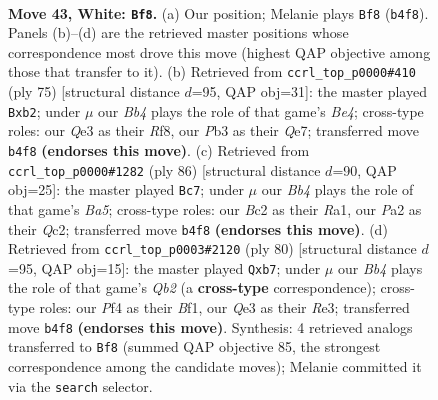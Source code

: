 \documentclass[11pt]{article}
\begin{document}
\clearpage

\begin{figure}[p]\centering
\begin{subfigure}{0.46\textwidth}\centering
\resizebox{\linewidth}{!}{%
\newchessgame
\chessboard[
  setfen={r1b4k/ppp2pp1/5n2/1q5p/1B3P1b/1P2Q2P/P1B3P1/R5K1 w - - 1 43},
  showmover=false,
  pgfstyle=straightmove, color=movearrow, markmove={b4-f8}
]}
\caption{}
\end{subfigure}\hfill
\begin{subfigure}{0.46\textwidth}\centering
\resizebox{\linewidth}{!}{%
\newchessgame
\chessboard[
  setfen={5r1k/4q1p1/6Bp/pb1QbP2/1p6/4B2P/PP4P1/2R3K1 b - - 0 38},
  showmover=false,
  pgfstyle=straightmove, color=movearrow, markmove={e5-b2}
]}
\caption{}
\end{subfigure}
\\[4pt]
\begin{subfigure}{0.46\textwidth}\centering
\resizebox{\linewidth}{!}{%
\newchessgame
\chessboard[
  setfen={6r1/5ppk/q3bb1p/B1p1p3/P1P1P3/5N1P/2Q2PPK/R7 w - - 1 44},
  showmover=false,
  pgfstyle=straightmove, color=movearrow, markmove={a5-c7}
]}
\caption{}
\end{subfigure}\hfill
\begin{subfigure}{0.46\textwidth}\centering
\resizebox{\linewidth}{!}{%
\newchessgame
\chessboard[
  setfen={3r2k1/1q2bp1p/4p2B/p1n1P1pP/P7/4R1P1/1Q3P2/5BK1 w - - 2 41},
  showmover=false,
  pgfstyle=straightmove, color=movearrow, markmove={b2-b7}
]}
\caption{}
\end{subfigure}
\caption{\textbf{Move 43, White: \texttt{Bf8}.} (a) Our position; Melanie plays \texttt{Bf8} (\texttt{b4f8}). Panels (b)--(d) are the retrieved master positions whose correspondence most drove this move (highest QAP objective among those that transfer to it). (b) Retrieved from \texttt{ccrl\_top\_p0000\#410} (ply 75) [structural distance $d$=95, QAP obj=31]: the master played \texttt{Bxb2}; under $\mu$ our \emph{Bb4} plays the role of that game's \emph{Be4}; cross-type roles: our \emph{Q}e3 as their \emph{R}f8, our \emph{P}b3 as their \emph{Q}e7; transferred move \texttt{b4f8} \textbf{(endorses this move)}. (c) Retrieved from \texttt{ccrl\_top\_p0000\#1282} (ply 86) [structural distance $d$=90, QAP obj=25]: the master played \texttt{Bc7}; under $\mu$ our \emph{Bb4} plays the role of that game's \emph{Ba5}; cross-type roles: our \emph{B}c2 as their \emph{R}a1, our \emph{P}a2 as their \emph{Q}c2; transferred move \texttt{b4f8} \textbf{(endorses this move)}. (d) Retrieved from \texttt{ccrl\_top\_p0003\#2120} (ply 80) [structural distance $d$=95, QAP obj=15]: the master played \texttt{Qxb7}; under $\mu$ our \emph{Bb4} plays the role of that game's \emph{Qb2} (a \textbf{cross-type} correspondence); cross-type roles: our \emph{P}f4 as their \emph{B}f1, our \emph{Q}e3 as their \emph{R}e3; transferred move \texttt{b4f8} \textbf{(endorses this move)}. Synthesis: 4 retrieved analogs transferred to \texttt{Bf8} (summed QAP objective 85, the strongest correspondence among the candidate moves); Melanie committed it via the \texttt{search} selector.}
\label{fig:thought-m84}
\end{figure}
\end{document}
